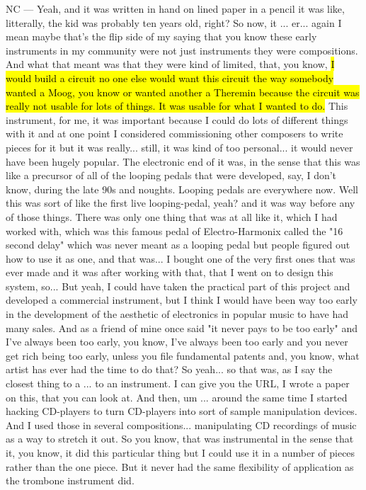 NC — Yeah, and it was written in hand on lined paper in a pencil it was like, litterally, the kid  was probably ten years old, right? So now, it ... er... again I mean maybe that's the flip side of my saying that you know these early instruments in my community were not just instruments they were compositions. And what that meant was that they were kind of limited, that, you know, \hl{I would build a circuit no one else would want this circuit the way somebody wanted a Moog, you know or wanted another a Theremin because the circuit was really not usable for lots of things. It was usable for what I wanted to do.} This instrument, for me, it was important because I could do lots of different things with it and at one point I considered commissioning other composers to write pieces for it but it was really... still, it was kind of too personal... it would never have been hugely popular. The electronic end of it was, in the sense that this was like a precursor of all of the looping pedals that were developed, say, I don't know, during the late 90s and noughts. Looping pedals are everywhere now. Well this was sort of like the first live looping-pedal, yeah?  and it was way before any of those things. There was only one thing that was at all like it, which I had worked with, which was this famous pedal of Electro-Harmonix called the "16 second delay" which was never meant as a looping pedal but people figured out how to use it as one, and that was... I bought one of the very first ones that was ever made and it was after working with that, that I went on to design this system, so... But yeah, I could have taken the practical part of this project and developed a commercial instrument, but I think I would have been way too early in the development of the aesthetic of electronics in popular music to have had many sales. And as a friend of mine once said "it never pays to be too early" and I've always been too early, you know, I've always been too early and you never get rich being too early, unless you file fundamental patents and, you know, what artist has ever had the time to do that? So yeah... so that was, as I say the closest thing to a ... to an instrument. I can give you the URL, I wrote a paper on this, that you can look at. And then, um ... around the same time I started hacking CD-players to turn CD-players into sort of sample manipulation devices. And I used those in several compositions... manipulating CD recordings of music as a way to stretch it out. So you know, that was instrumental in the sense that it, you know, it did this particular thing but I could use it in a number of pieces rather than the one piece. But it never had the same flexibility of application as the trombone instrument did. 

